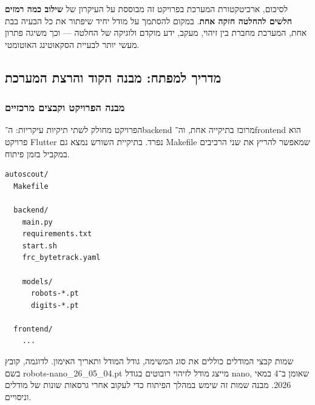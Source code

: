 לסיכום, ארכיטקטורת המערכת בפרויקט זה מבוססת על העיקרון של
\textbf{שילוב כמה רמזים חלשים להחלטה חזקה אחת}. במקום להסתמך על מודל
יחיד שיפתור את כל הבעיה בבת אחת, המערכת מחברת בין זיהוי, מעקב, ידע
מוקדם ולוגיקה של החלטה — וכך משיגה פתרון מעשי יותר לבעיית הסקאוטינג
האוטומטי.


\subsection{מדריך למפתח: מבנה הקוד והרצת המערכת}


\subsubsection{מבנה הפרויקט וקבצים מרכזיים}

הפרויקט מחולק לשתי תיקיות עיקריות: ה־\textenglish{backend} מרוכז
בתיקייה אחת, וה־\textenglish{frontend} הוא פרויקט
\textenglish{Flutter} נפרד. בתיקיית השורש נמצא גם
\textenglish{Makefile} שמאפשר להריץ את שני הרכיבים במקביל בזמן פיתוח.

\begin{english}
\begin{verbatim}
autoscout/
  Makefile

  backend/
    main.py
    requirements.txt
    start.sh
    frc_bytetrack.yaml

    models/
      robots-*.pt
      digits-*.pt

  frontend/
    ...
\end{verbatim}
\end{english}

שמות קבצי המודלים כוללים את סוג המשימה, גודל המודל ותאריך האימון.
לדוגמה, קובץ בשם \textenglish{robots-nano\_26\_05\_04.pt} מייצג מודל
לזיהוי רובוטים בגודל \textenglish{nano}, שאומן ב־4 במאי 2026. מבנה
שמות זה שימש במהלך הפיתוח כדי לעקוב אחרי גרסאות שונות של מודלים
וניסויים.

